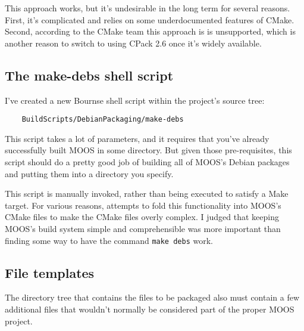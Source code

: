 \documentclass[letterpaper,10pt]{article}
\begin{document}
This approach works, but it's undesirable in the long term for several reasons.  
First, it's complicated and relies on some underdocumented features of CMake.
Second, according to the CMake team this approach is is unsupported, which is
another reason to switch to using CPack 2.6 once it's widely available.

\subsection{The make-debs shell script}
I've created a new Bournse shell script within the project's source tree:
\begin{verbatim}
    BuildScripts/DebianPackaging/make-debs
\end{verbatim} 

This script takes a lot of parameters, and it requires that 
you've already successfully built MOOS in some directory.  But
given those pre-requisites, this script should do a pretty good
job of building all of MOOS's Debian packages and putting them
into a directory you specify.

This script is manually invoked, rather than being executed to
satisfy a Make target.  For various reasons, attempts
to fold this functionality into MOOS's CMake files to make the
CMake files overly complex.  I judged that keeping MOOS's build 
system simple and comprehensible was more important than finding
some way to have the command \verb|make debs| work.

\subsection{File templates}
The directory tree that contains the files to be packaged also
must contain a few additional files that wouldn't normally be
considered part of the proper MOOS project.
\end{document}
